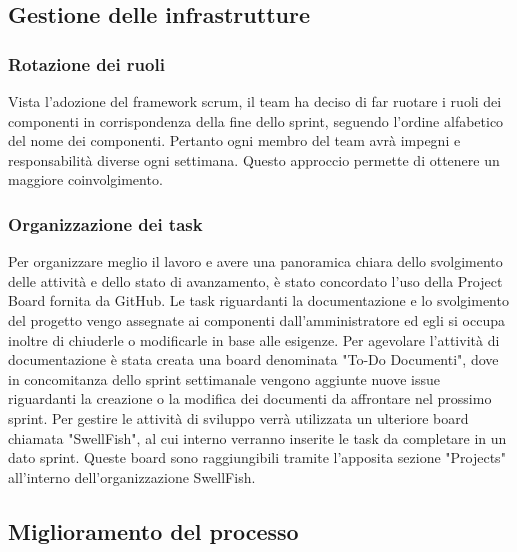 \documentclass[12pt]{article}
\begin{document}
\subsection{Gestione delle infrastrutture}
\subsubsection{Rotazione dei ruoli}
Vista l'adozione del framework scrum, il team ha deciso di far ruotare i ruoli dei componenti in corrispondenza della fine dello sprint, seguendo l'ordine alfabetico del nome dei componenti.
Pertanto ogni membro del team avrà impegni e responsabilità diverse ogni settimana. Questo approccio permette di ottenere un maggiore coinvolgimento.

\subsubsection{Organizzazione dei task}
Per organizzare meglio il lavoro e avere una panoramica chiara dello svolgimento delle attività e dello stato di avanzamento, è stato concordato l'uso della Project Board fornita da GitHub.
Le task riguardanti la documentazione e lo svolgimento del progetto vengo assegnate ai componenti dall'amministratore ed egli si occupa inoltre di chiuderle o modificarle in base alle esigenze.
Per agevolare l'attività di documentazione è stata creata una board denominata "To-Do Documenti", dove in concomitanza dello sprint settimanale vengono aggiunte nuove issue riguardanti la creazione o la modifica dei documenti da affrontare nel prossimo sprint.
Per gestire le attività di sviluppo verrà utilizzata un ulteriore board chiamata "SwellFish", al cui interno verranno inserite le task da completare in un dato sprint.
Queste board sono raggiungibili tramite l'apposita sezione "Projects" all'interno dell'organizzazione SwellFish.

\subsection{Miglioramento del processo} 
\end{document}
